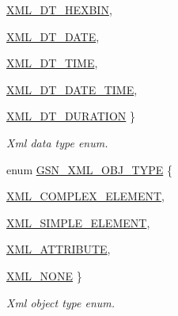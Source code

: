 \begin{DoxyCompactItemize}
\hyperlink{a00679_gga0ed9af8f445f8406f6a0a2a84e40eb81a2ff4ed47ada2c00692c9c9a0655b823b}{XML\_\-DT\_\-HEXBIN}, 
\par
\hyperlink{a00679_gga0ed9af8f445f8406f6a0a2a84e40eb81ad3f04967ac31dc26af9e1ec7171827f3}{XML\_\-DT\_\-DATE}, 
\par
\hyperlink{a00679_gga0ed9af8f445f8406f6a0a2a84e40eb81a9ce6a274f7a3d44c40d2bb63097bd074}{XML\_\-DT\_\-TIME}, 
\par
\hyperlink{a00679_gga0ed9af8f445f8406f6a0a2a84e40eb81a921e2ecef629b6ed3e2f92d381d61689}{XML\_\-DT\_\-DATE\_\-TIME}, 
\par
\hyperlink{a00679_gga0ed9af8f445f8406f6a0a2a84e40eb81a6b0ea3e9030744edfc1e553b0ebfa84a}{XML\_\-DT\_\-DURATION}
 \}
\begin{DoxyCompactList}\small\item\em Xml data type enum. \end{DoxyCompactList}\item 
enum \hyperlink{a00679_gad31ca0a5bf81e8fbb6c9a048ef2c02c8}{GSN\_\-XML\_\-OBJ\_\-TYPE} \{ \par
\hyperlink{a00679_ggad31ca0a5bf81e8fbb6c9a048ef2c02c8ae9a01607ca73e1f0ebf307899ae2400a}{XML\_\-COMPLEX\_\-ELEMENT}, 
\par
\hyperlink{a00679_ggad31ca0a5bf81e8fbb6c9a048ef2c02c8ad6cf8f62803b9d25b393076d1b9c8b19}{XML\_\-SIMPLE\_\-ELEMENT}, 
\par
\hyperlink{a00679_ggad31ca0a5bf81e8fbb6c9a048ef2c02c8ab9f76b8e78f34714cff0acfdd5f411f0}{XML\_\-ATTRIBUTE}, 
\par
\hyperlink{a00679_ggad31ca0a5bf81e8fbb6c9a048ef2c02c8a8fa6be1d81686913a2ab22707fa18e4c}{XML\_\-NONE}
 \}
\begin{DoxyCompactList}\small\item\em Xml object type enum. \end{DoxyCompactList}\end{DoxyCompactItemize}
